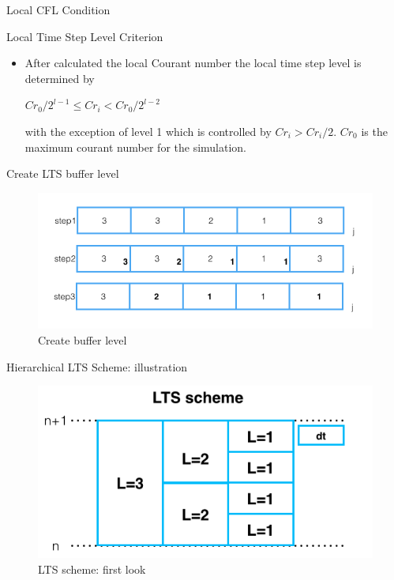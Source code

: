 \documentclass{beamer}
\begin{document}
\begin{frame}[t]{Local CFL Condition}
\begin{block}{Local Time Step Level Criterion}
    \begin{itemize}
      \item After calculated the local Courant number the local time step level is determined by
      \begin{center}
      $Cr_{0}/2^{l-1}\leq Cr_{i}< Cr_{0}/2^{l-2}$
      \end{center}
      with the exception of level 1 which is controlled by $Cr_{i}> Cr_{i}/2$. $Cr_{0}$ is the maximum courant number for the simulation.
    \end{itemize}
  \end{block}
\end{frame}
\begin{frame}{Create LTS buffer level}
\begin{figure}[p]
    \centering
    \includegraphics[width=1\textwidth]{LTS_buffer}
    \caption{Create buffer level}
    \label{fig:LTSbuffer}
\end{figure}
\end{frame}
\begin{frame}{Hierarchical LTS Scheme: illustration}
\begin{figure}[p]
    \centering
    \includegraphics[width=1\textwidth]{LTS_scheme}
    \caption{LTS scheme: first look}
    \label{fig:awesome_image}
\end{figure}
\end{frame}
\end{document}
